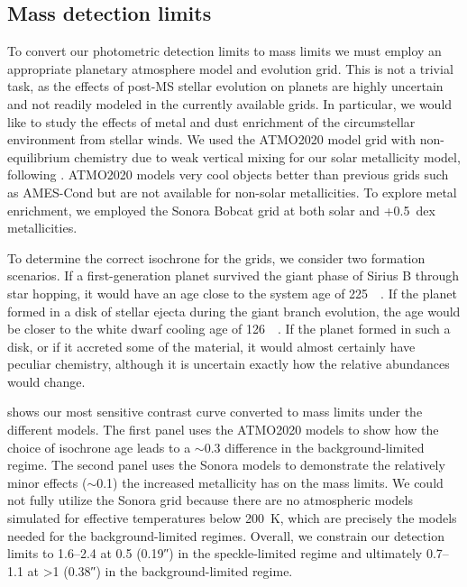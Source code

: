 \documentclass[twocolumn,linenumbers]{aastex631}
\begin{document}
\subsection{Mass detection limits}\label{sec:mass-limits}

To convert our photometric detection limits to mass limits we must employ an appropriate planetary atmosphere model and evolution grid. This is not a trivial task, as the effects of post-MS stellar evolution on planets are highly uncertain and not readily modeled in the currently available grids. In particular, we would like to study the effects of metal and dust enrichment of the circumstellar environment from stellar winds. We used the ATMO2020 model grid \citep{phillipsNewSetAtmosphere2020a} with non-equilibrium chemistry due to weak vertical mixing for our solar metallicity model, following \citet{pathakHighContrastImaging2021}. ATMO2020 models very cool objects better than previous grids such as AMES-Cond \citep{allardModelsVerylowmassStars2012} but are not available for non-solar metallicities. To explore metal enrichment, we employed the Sonora Bobcat grid \citep{marleySonoraBobcatCloudfree2021,marleySonoraBrownDwarf2021} at both solar and +\qty{0.5}{dex} metallicities.

To determine the correct isochrone for the grids, we consider two formation scenarios. If a first-generation planet survived the giant phase of Sirius B through star hopping, it would have an age close to the system age of \qty{225}{\mega\year}. If the planet formed in a disk of stellar ejecta during the giant branch evolution, the age would be closer to the white dwarf cooling age of \qty{126}{\mega\year}. If the planet formed in such a disk, or if it accreted some of the material, it would almost certainly have peculiar chemistry, although it is uncertain exactly how the relative abundances would change.

 shows our most sensitive contrast curve converted to mass limits under the different models. The first panel uses the ATMO2020 models to show how the choice of isochrone age leads to a $\sim$\qty{0.3}{\jupitermass} difference in the background-limited regime. The second panel uses the Sonora models to demonstrate the relatively minor effects ($\sim$\qty{0.1}{\jupitermass}) the increased metallicity has on the mass limits. We could not fully utilize the Sonora grid because there are no atmospheric models simulated for effective temperatures below \qty{200}{\kelvin}, which are precisely the models needed for the background-limited regimes. Overall, we constrain our detection limits to \qtyrange{1.6}{2.4}{\jupitermass} at \qty{0.5}{\au} (\ang{;;0.19}) in the speckle-limited regime and ultimately \qtyrange{0.7}{1.1}{\jupitermass} at \textgreater\qty{1}{\au} (\ang{;;0.38}) in the background-limited regime.
\end{document}
